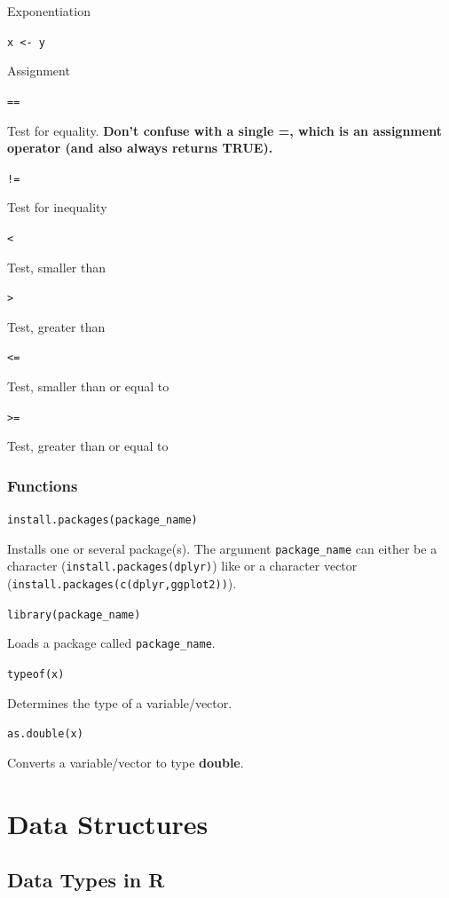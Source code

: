 \documentclass[
]{book}
\begin{document}
Exponentiation

\texttt{x\ \textless{}-\ y}

Assignment

\texttt{==}

Test for equality. \textbf{Don't confuse with a single =, which is an assignment operator (and also always returns TRUE).}

\texttt{!=}

Test for inequality

\texttt{\textless{}}

Test, smaller than

\texttt{\textgreater{}}

Test, greater than

\texttt{\textless{}=}

Test, smaller than or equal to

\texttt{\textgreater{}=}

Test, greater than or equal to

\hypertarget{functions}{%
\subsection{Functions}\label{functions}}

\texttt{install.packages(package\_name)}

Installs one or several package(s).
The argument \texttt{package\_name} can either be a character (\texttt{install.packages(\textquotesingle{}dplyr\textquotesingle{})}) like or a character vector (\texttt{install.packages(c(\textquotesingle{}dplyr\textquotesingle{},\textquotesingle{}ggplot2\textquotesingle{}))}).

\texttt{library(package\_name)}

Loads a package called \texttt{package\_name}.

\hfill\break

\texttt{typeof(x)}

Determines the type of a variable/vector.

\hfill\break

\texttt{as.double(x)}

Converts a variable/vector to type \textbf{double}.

\hypertarget{data-structures}{%
\chapter{Data Structures}\label{data-structures}}

\hypertarget{data-types-in-r}{%
\section{Data Types in R}\label{data-types-in-r}}
\end{document}
